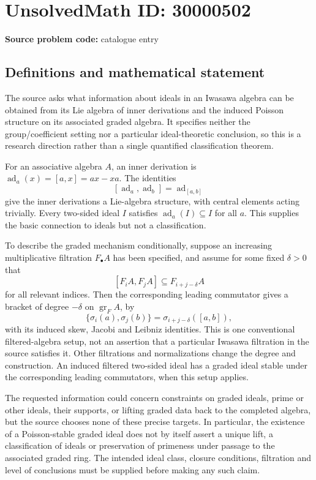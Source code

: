 \documentclass[11pt]{article}
\begin{document}
\section*{UnsolvedMath ID: 30000502}
\textbf{Source problem code:} catalogue entry
\subsection{Definitions and mathematical statement}
The source asks what information about ideals in an Iwasawa algebra can be obtained from its Lie algebra of inner derivations and the induced Poisson structure on its associated graded algebra. It specifies neither the group/coefficient setting nor a particular ideal-theoretic conclusion, so this is a research direction rather than a single quantified classification theorem.

For an associative algebra \(A\), an inner derivation is \(\operatorname{ad}_a(x)=[a,x]=ax-xa\). The identities
\[
 [\operatorname{ad}_a,\operatorname{ad}_b]=\operatorname{ad}_{[a,b]}
\]
give the inner derivations a Lie-algebra structure, with central elements acting trivially. Every two-sided ideal \(I\) satisfies \(\operatorname{ad}_a(I)\subseteq I\) for all \(a\). This supplies the basic connection to ideals but not a classification.

To describe the graded mechanism conditionally, suppose an increasing multiplicative filtration \(F_\bullet A\) has been specified, and assume for some fixed \(\delta>0\) that
\[
 [F_iA,F_jA]\subseteq F_{i+j-\delta}A
\]
for all relevant indices. Then the corresponding leading commutator gives a bracket of degree \(-\delta\) on \(\operatorname{gr}_F A\), by
\[
 \{\sigma_i(a),\sigma_j(b)\}
 =\sigma_{i+j-\delta}([a,b]),
\]
with its induced skew, Jacobi and Leibniz identities. This is one conventional filtered-algebra setup, not an assertion that a particular Iwasawa filtration in the source satisfies it. Other filtrations and normalizations change the degree and construction. An induced filtered two-sided ideal has a graded ideal stable under the corresponding leading commutators, when this setup applies.

The requested information could concern constraints on graded ideals, prime or other ideals, their supports, or lifting graded data back to the completed algebra, but the source chooses none of these precise targets. In particular, the existence of a Poisson-stable graded ideal does not by itself assert a unique lift, a classification of ideals or preservation of primeness under passage to the associated graded ring. The intended ideal class, closure conditions, filtration and level of conclusions must be supplied before making any such claim.
\end{document}

